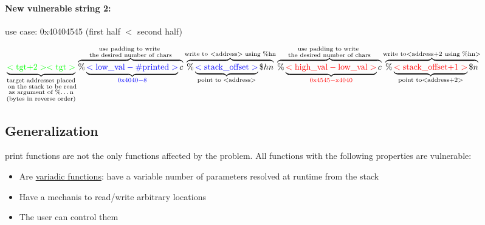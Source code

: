 \documentclass{article}
\begin{document}
\paragraph{New vulnerable string 2:} use case: 0x\color{blue}4040\color{red}4545 \color{black}(\color{blue}first half \color{black} $<$ \color{red} second half\color{black})\\
\begin{adjustwidth}{-3cm}{-3cm}
\centering
$\underbrace{
	\color{green}<\text{tgt+2}>
	<\text{tgt}>
}_{\substack{\text{target addresses placed}\\\text{ on the stack to be read}\\\text{as argument of \%\dots n}\\\text{(bytes in reverse order)}}}
\overbrace{
	\color{black}\%
	\underbrace{
		\color{blue} <\text{low}\_\text{val}-\text{\#printed}>
	}_{
		\color{blue} 0\text{x}4040 - 8\color{black}
	}
	\color{black} c
}^{
	\substack{
		\text{use padding to write }\\
		\text{the desired number of chars}
	}
}
\overbrace{
	\%
	\underbrace{
		\color{blue} <\text{stack}\_
		\text{offset}>
	}_{\text{point to \color{red}}<
	\text{address}>}
	\color{black} \$hn
}^{
	\text{write to }<\text{address}>\text{ using \%hn}
}
\overbrace{
	\color{black} \% 
	\underbrace{
		\color{red} <\text{high}\_\text{val}-\text{low}\_\text{val}>
	}_{
		\color{red} 0\text{x}4545-\text{x}4040
	} 
	\color{black} c
}^{
	\substack{
		\text{use padding to write }\\
		\text{the desired number of chars}
	}
}
\overbrace{
	\color{black} \%
	\underbrace{
		\color{red} <\text{stack}\_\text{offset+1}>
	}_{
		\text{point to}<\text{address+2}>
	}
	\color{black} \$n
}^{
	\text{write to}<\text{address+2 using \%hn}>
}
$
\end{adjustwidth}
\subsection{Generalization} print functions are not the only functions affected by the problem. All functions with the following properties are vulnerable:
\begin{itemize}
\item Are \underline{variadic functions}: have a variable number of parameters resolved at runtime from the stack
\item Have a mechanis to read/write arbitrary locations
\item The user can control them
\end{itemize}
\end{document}
